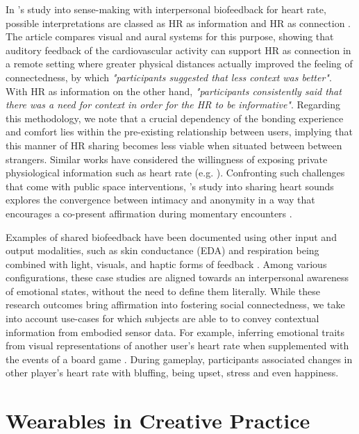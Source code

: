 In \citeauthor{slovak_understanding_2012}'s study into sense-making with interpersonal biofeedback for heart rate, possible interpretations are classed as HR as information and HR as connection \cite{slovak_understanding_2012}. The article compares visual and aural systems for this purpose, showing that auditory feedback of the cardiovascular activity can support HR as connection in a remote setting where greater physical distances actually improved the feeling of connectedness, by which \textit{"participants suggested that less context was better"}. With HR as information on the other hand, \textit{"participants consistently said that there was a need for context in order for the HR to be informative"}. Regarding this methodology, we note that a crucial dependency of the bonding experience and comfort lies within the pre-existing relationship between users, implying that this manner of HR sharing becomes less viable when situated between between strangers. Similar works have considered the willingness of exposing private physiological information such as heart rate (e.g. \cite{walmink_displaying_2013}). Confronting such challenges that come with public space interventions, \citeauthor{howell_life-affirming_2019}'s study into sharing heart sounds explores the convergence between intimacy and anonymity in a way that encourages a co-present affirmation during momentary encounters \cite{howell_life-affirming_2019}.

Examples of shared biofeedback have been documented using other input and output modalities, such as skin conductance (EDA) and respiration being combined with light, visuals, and haptic forms of feedback \cite{frey_breeze_2018,howell_biosignals_2016,ashford_eeg_2019}. Among various configurations, these case studies are aligned towards an interpersonal awareness of emotional states, without the need to define them literally. While these research outcomes bring affirmation into fostering social connectedness, we take into account use-cases for which subjects are able to to convey contextual information from embodied sensor data. For example, inferring emotional traits from visual representations of another user's heart rate when supplemented with the events of a board game \cite{frey_remote_2016}. During gameplay, participants associated changes in other player's heart rate with bluffing, being upset, stress and even happiness.

\section{Wearables in Creative Practice}
\label{lit_review:biosignals_creativity}

